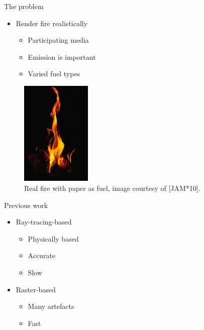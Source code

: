 \documentclass{beamer}
\begin{document}
\begin{frame}{The problem}

\begin{multicols}{2}

\begin{itemize}
\setlength\itemsep{0.5em}
\item Render fire realistically 
		\begin{itemize}
		\setlength\itemsep{0.5em}
		\item Participating media 
		\item Emission is important
		\item Varied fuel types
		\end{itemize}
\end{itemize}

\begin{figure}[t!]
\begin{center}
\includegraphics[width=0.3\textwidth]{img/real_fire1} 
\caption*{\tiny{Real fire with paper as fuel, image courtesy of [JAM*10].}}
\end{center}
\end{figure}
\end{multicols}


\end{frame}

\begin{frame}{Previous work}

\begin{multicols}{2}

\begin{itemize}
\setlength\itemsep{0.5em}
\item Ray-tracing-based
		\begin{itemize}
		\setlength\itemsep{0.5em}
		\item Physically based 
		\item Accurate
		\item Slow
		\end{itemize}
\item Raster-based
		\begin{itemize}
		\setlength\itemsep{0.5em}
		\item Many artefacts
		\item Fast
		\end{itemize}
\end{itemize}


\end{multicols}


\end{frame}
\end{document}
